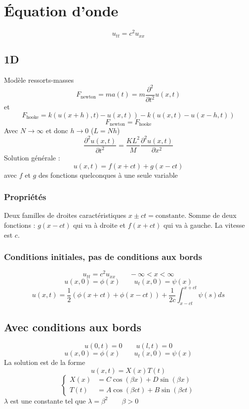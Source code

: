 \documentclass[resume]{subfiles}
\begin{document}
\section{Équation d'onde}
$$\boxed{u_{tt}=c^2u_{xx}}$$
\subsection{1D}
Modèle ressorts-masses
$$F_\text{newton}=ma(t)=m\frac{\partial^2}{\partial t^2}u(x,t)$$
et
$$F_\text{hooke}=k\left(u(x+h),t)-u(x,t)\right)-k\left(u(x,t)-u(x-h,t)\right)$$
$$F_\text{newton}=F_\text{hooke}$$
Avec $N\to\infty$ et donc $h\to 0$ ($L=Nh$)
$$\frac{\partial^2 u(x,t)}{\partial t^2}=\frac{KL^2}{M}\frac{\partial^2 u(x,t)}{\partial x^2}$$
Solution générale :
$$\boxed{u(x,t)=f(x+ct)+g(x-ct)}$$
avec $f$ et $g$ des fonctions quelconques à une seule variable
\subsubsection{Propriétés}
Deux familles de droites caractéristiques $x\pm ct=\text{constante}$. Somme de deux fonctions : $g(x-ct)$ qui va à droite et $f(x+ct)$ qui va à gauche. La vitesse est $c$.
\subsubsection{Conditions initiales, pas de conditions aux bords}
$$u_{tt}=c^2u_{xx}\qquad -\infty<x<\infty$$
$$u(x,0)=\phi(x)\qquad u_t(x,0)=\psi(x)$$
$$u(x,t)=\frac{1}{2}\left(\phi(x+ct)+\phi(x-ct)\right)+\frac{1}{2c}\int_{x-ct}^{x+ct}\psi(s)ds$$
\subsection{Avec conditions aux bords}
$$u(0,t)=0\qquad u(l,t)=0$$
$$u(x,0)=\phi(x)\qquad u_t(x,0)=\psi(x)$$
La solution est de la forme 
$$u(x,t)=X(x)T(t)$$
$$\begin{cases}X(x)&=C\cos(\beta x)+D\sin(\beta x)\\T(t) &= A\cos(\beta ct)+B\sin(\beta ct)\end{cases}$$
$\lambda$ est une constante tel que $\lambda=\beta^2\qquad \beta>0$
\end{document}
